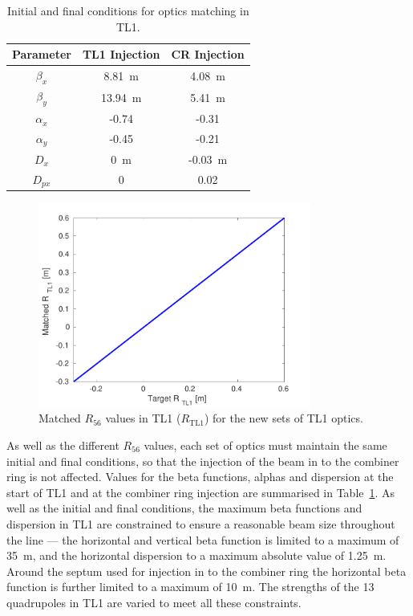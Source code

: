 \begin{table}
  \begin{center}
    \begin{tabular}{| c c c |}
	   \hline
       Parameter & TL1 Injection & CR Injection \\ \hline
       \(\beta_x\) & 8.81~m & 4.08~m \\
       \(\beta_y\) & 13.94~m & 5.41~m \\
       \(\alpha_x\) & -0.74 & -0.31 \\
       \(\alpha_y\) & -0.45 & -0.21 \\ 
       \(D_x\) & 0~m & -0.03~m \\ 
       \(D_{px}\) & 0 & 0.02 \\ \hline
    \end{tabular}
    \caption{Initial and final conditions for optics matching in TL1.}
  	\label{t:tl1MatchParams}
  \end{center}
\end{table}
\begin{figure}
  \centering
  \includegraphics[width=0.8\textwidth]{Figures/propagation/r56MatchedVsTarget}
  \caption{Matched \(R_{56}\) values in TL1 (\(R_{\mathrm{TL1}}\)) for the new sets of TL1 optics.}
  \label{f:r56MatchedVsTarget}
\end{figure}




As well as the different \(R_{56}\) values, each set of optics must maintain the same initial and final conditions, so that the injection of the beam in to the combiner ring is not affected. Values for the beta functions, alphas and dispersion at the start of TL1 and at the combiner ring injection are summarised in Table~\ref{t:tl1MatchParams}. As well as the initial and final conditions, the maximum beta functions and dispersion in TL1 are constrained to ensure a reasonable beam size throughout the line --- the horizontal and vertical beta function is limited to a maximum of 35~m, and the horizontal dispersion to a maximum absolute value of 1.25~m. Around the septum used for injection in to the combiner ring the horizontal beta function is further limited to a maximum of 10~m. The strengths of the 13 quadrupoles in TL1 are varied to meet all these constraints.


